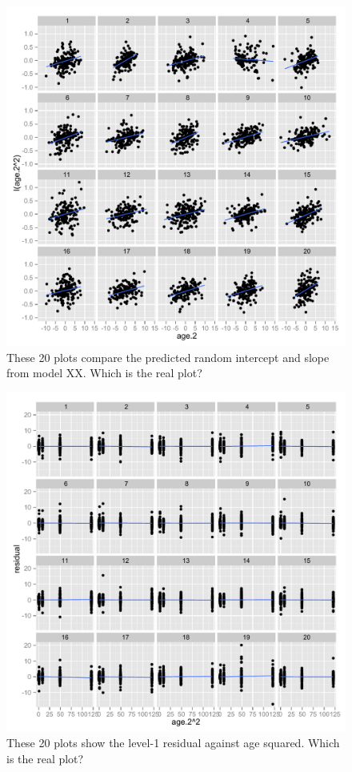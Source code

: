 \documentclass{article} %
\begin{document}
\begin{figure}
	\centering
	\includegraphics[width=\textwidth]{autism_ranef3_true4.pdf}
	\caption{\label{fig:lineup-ranef3} These 20 plots compare the predicted random intercept and slope from model XX. Which is the real plot?}
\end{figure}

\begin{figure}
	\centering
	\includegraphics[width=\textwidth]{autism_agesq_true19.pdf}
	\caption{\label{fig:lineup-agesq} These 20 plots show the level-1 residual against age squared. Which is the real plot?}
\end{figure}
\end{document}

